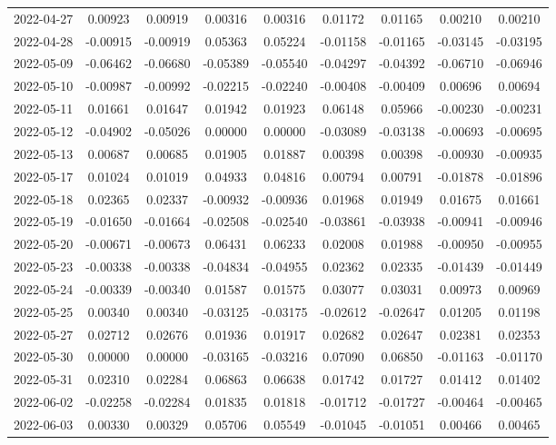 {\begin{footnotesize}
\begin{longtable}{lcccccccc}
2022-04-27 & 0.00923 & 0.00919 & 0.00316 & 0.00316 & 0.01172 & 0.01165 & 0.00210 & 0.00210 \\
2022-04-28 & -0.00915 & -0.00919 & 0.05363 & 0.05224 & -0.01158 & -0.01165 & -0.03145 & -0.03195 \\
2022-05-09 & -0.06462 & -0.06680 & -0.05389 & -0.05540 & -0.04297 & -0.04392 & -0.06710 & -0.06946 \\
2022-05-10 & -0.00987 & -0.00992 & -0.02215 & -0.02240 & -0.00408 & -0.00409 & 0.00696 & 0.00694 \\
2022-05-11 & 0.01661 & 0.01647 & 0.01942 & 0.01923 & 0.06148 & 0.05966 & -0.00230 & -0.00231 \\
2022-05-12 & -0.04902 & -0.05026 & 0.00000 & 0.00000 & -0.03089 & -0.03138 & -0.00693 & -0.00695 \\
2022-05-13 & 0.00687 & 0.00685 & 0.01905 & 0.01887 & 0.00398 & 0.00398 & -0.00930 & -0.00935 \\
2022-05-17 & 0.01024 & 0.01019 & 0.04933 & 0.04816 & 0.00794 & 0.00791 & -0.01878 & -0.01896 \\
2022-05-18 & 0.02365 & 0.02337 & -0.00932 & -0.00936 & 0.01968 & 0.01949 & 0.01675 & 0.01661 \\
2022-05-19 & -0.01650 & -0.01664 & -0.02508 & -0.02540 & -0.03861 & -0.03938 & -0.00941 & -0.00946 \\
2022-05-20 & -0.00671 & -0.00673 & 0.06431 & 0.06233 & 0.02008 & 0.01988 & -0.00950 & -0.00955 \\
2022-05-23 & -0.00338 & -0.00338 & -0.04834 & -0.04955 & 0.02362 & 0.02335 & -0.01439 & -0.01449 \\
2022-05-24 & -0.00339 & -0.00340 & 0.01587 & 0.01575 & 0.03077 & 0.03031 & 0.00973 & 0.00969 \\
2022-05-25 & 0.00340 & 0.00340 & -0.03125 & -0.03175 & -0.02612 & -0.02647 & 0.01205 & 0.01198 \\
2022-05-27 & 0.02712 & 0.02676 & 0.01936 & 0.01917 & 0.02682 & 0.02647 & 0.02381 & 0.02353 \\
2022-05-30 & 0.00000 & 0.00000 & -0.03165 & -0.03216 & 0.07090 & 0.06850 & -0.01163 & -0.01170 \\
2022-05-31 & 0.02310 & 0.02284 & 0.06863 & 0.06638 & 0.01742 & 0.01727 & 0.01412 & 0.01402 \\
2022-06-02 & -0.02258 & -0.02284 & 0.01835 & 0.01818 & -0.01712 & -0.01727 & -0.00464 & -0.00465 \\
2022-06-03 & 0.00330 & 0.00329 & 0.05706 & 0.05549 & -0.01045 & -0.01051 & 0.00466 & 0.00465 \\

\end{longtable}
\end{footnotesize}}
